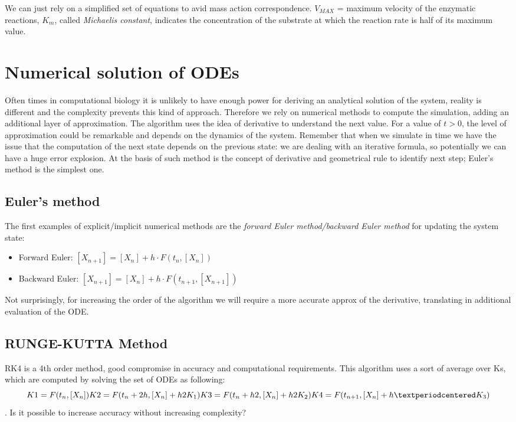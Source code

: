 \noindent
We can just rely on a simplified set of equations to avid mass action correspondence.
$V_{MAX}$ = maximum velocity of the enzymatic reactions, $K_m$, called \emph{Michaelis constant}, indicates the concentration of the substrate at which the reaction rate is half of its maximum value.

\section{Numerical solution of ODEs}
Often times in computational biology it is unlikely to have enough power for deriving an analytical solution of the system, reality is different and the complexity prevents this kind of approach.
Therefore we rely on numerical methods to compute the simulation, adding an additional layer of approximation.
The algorithm uses the idea of derivative to understand the next value.
For a value of $t>0$, the level of approximation could be remarkable and depends on the dynamics of the system.
Remember that when we simulate in time we have the issue that the computation of the next state depends on the previous state: we are dealing with an iterative formula, so potentially we can have a huge error explosion.
At the basis of such method is the concept of derivative and geometrical rule to identify next step; Euler's method is the simplest one.

  \subsection{Euler's method}
  The first examples of explicit/implicit numerical methods are the \emph{forward Euler method/backward Euler method} for updating the system state:

  \begin{itemize}
    \item Forward Euler: $[X_{n+1}] = [X_n]+h·F(t_n,[X_n])$
    \item Backward Euler: $[X_{n+1}] = [X_n]+h·F(t_{n+1},[X_{n+1}])$
  \end{itemize}
\noindent
  Not surprisingly, for increasing the order of the algorithm we will require a more accurate approx of the derivative, translating in additional evaluation of the ODE.

  \subsection{RUNGE-KUTTA Method}
  RK4 is a 4th order method, good compromise in accuracy and computational requirements.
  This algorithm uses a sort of average over Ks, which are computed by solving the set of ODEs as following: 
  $$K1 = F(t_n,[X_n])\\ K2 = F(t_n + 2h,[X_n]+ h2K_1)\\K3 = F(t_n + h2,[X_n]+ h2K_2)\\ K4 = F(t_{n+1},[X_n]+h·K_3)$$.
  Is it possible to increase accuracy without increasing complexity? 

